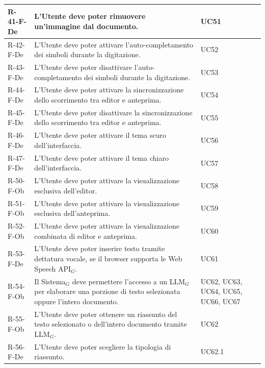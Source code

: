 \documentclass[a4paper, 10pt]{article}
\begin{document}
\begin{longtable}{|p{2.2cm}|p{7.5cm}|p{4cm}|}
R-41-F-De & L'Utente deve poter rimuovere un'immagine dal documento. & UC51 \\ \hline

R-42-F-De & L'Utente deve poter attivare l'auto-completamento dei simboli durante la digitazione. & UC52 \\ \hline

R-43-F-De & L'Utente deve poter disattivare l'auto-completamento dei simboli durante la digitazione. & UC53 \\ \hline

R-44-F-De & L'Utente deve poter attivare la sincronizzazione dello scorrimento tra editor e anteprima. & UC54 \\ \hline

R-45-F-De & L'Utente deve poter disattivare la sincronizzazione dello scorrimento tra editor e anteprima. & UC55 \\ \hline

R-46-F-De & L'Utente deve poter attivare il tema scuro dell'interfaccia. & UC56 \\ \hline

R-47-F-De & L'Utente deve poter attivare il tema chiaro dell'interfaccia. & UC57 \\ \hline

R-50-F-Ob & L'Utente deve poter attivare la visualizzazione esclusiva dell'editor. & UC58 \\ \hline

R-51-F-Ob & L'Utente deve poter attivare la visualizzazione esclusiva dell'anteprima. & UC59 \\ \hline

R-52-F-Ob & L'Utente deve poter attivare la visualizzazione combinata di editor e anteprima. & UC60 \\ \hline

R-53-F-De & L'Utente deve poter inserire testo tramite dettatura vocale, se il browser supporta le Web Speech API$_G$. & UC61 \\ \hline

R-54-F-Ob & Il Sistema$_G$ deve permettere l'accesso a un LLM$_G$ per elaborare una porzione di testo selezionata oppure l'intero documento. & UC62, UC63, UC64, UC65, UC66, UC67 \\ \hline

R-55-F-Ob & L'Utente deve poter ottenere un riassunto del testo selezionato o dell'intero documento tramite LLM$_G$. & UC62 \\ \hline

R-56-F-De & L'Utente deve poter scegliere la tipologia di riassunto. & UC62.1 \\ \hline


\end{longtable}
\end{document}
